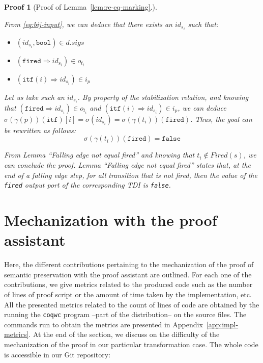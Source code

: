 \documentclass[pdflatex,sn-mathphys]{sn-jnl}%
\theoremstyle{thmstyleone}%
\theoremstyle{thmstyletwo}%
\newtheorem*{pf}{Proof}%
\theoremstyle{thmstylethree}%
\begin{document}
\begin{pf}[Proof of Lemma~\ref{lem:re-eq-marking}.]
\begin{itemize}
\begin{enumerate}
     From \eqref{eq:bij-input}, we can deduce that there exists an
     $id_{s_i}$ such that:
     \begin{itemize}
     \item $(id_{s_i},\mathtt{bool})\in{}d.sigs$
     \item $(\mathtt{fired}\Rightarrow{}id_{s_i})\in{}o_{t_i}$
     \item $(\mathtt{itf}(i)\Rightarrow{}id_{s_i})\in{}i_p$
     \end{itemize}

     Let us take such an $id_{s_i}$. By property of the stabilization
     relation, and knowing that
     $(\mathtt{fired}\Rightarrow{}id_{s_i})\in{}o_{t_i}$ and
     $(\mathtt{itf}(i)\Rightarrow{}id_{s_i})\in{}i_p$, we can deduce
     $\sigma(\gamma(p))(\texttt{itf})[i]=\sigma(id_{s_i})=\sigma(\gamma(t_i))(\texttt{fired})$.
     Thus, the goal can be rewritten as follows:
     \begin{equation*}
       \boxed{\sigma(\gamma(t_i))(\mathtt{fired})=\mathtt{false}}
     \end{equation*}

     From Lemma ``Falling edge not equal fired''
     \cite[p.~351]{Iampietro2021} and knowing that
     $t_i\notin{}Fired(s)$, we can conclude the proof. Lemma ``Falling
     edge not equal fired'' states that, at the end of a falling edge
     step, for all transition that is not fired, then the value of the
     \texttt{fired} output port of the corresponding TDI is
     \texttt{false}.
   \end{enumerate}
 \end{itemize}
 
\end{pf}

\section{Mechanization with the \coq{} proof assistant}
\label{sec:mech-of-the-proof}

Here, the different contributions pertaining to the mechanization of
the proof of semantic preservation with the \coq{} proof assistant are
outlined. For each one of the contributions, we give metrics related
to the produced code such as the number of lines of proof script or
the amount of time taken by the implementation, etc. All the presented
metrics related to the count of lines of code are obtained by the
running the \texttt{coqwc} program --part of the \coq{} distribution--
on the source files. The commands run to obtain the metrics are
presented in Appendix~\ref{app:impl-metrics}.  At the end of the
section, we discuss on the difficulty of the mechanization of the
proof in our particular transformation case. The whole code is
accessible in our \textsf{Git} repository:
\end{document}

